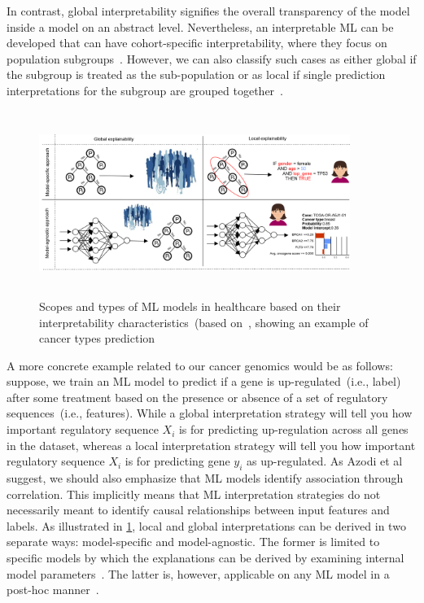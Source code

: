 \hspace*{3.5mm} In contrast, global interpretability signifies the overall transparency of the model inside a model on an abstract level. Nevertheless, an interpretable ML can be developed that can have cohort-specific interpretability, where they focus on population subgroups~\cite{stiglic2020interpretability}. However, we can also classify such cases as either global if the subgroup is treated as the sub-population or as local if single prediction interpretations for the subgroup are grouped together~\cite{molnar2019interpretable}. 

\begin{figure}[h]
	\centering
	\includegraphics[width=0.9\textwidth,height=60mm]{images/lvg_cancer.png}	
    \caption{Scopes and types of ML models in healthcare based on their interpretability characteristics~(based on~\cite{stiglic2020interpretability}, showing an example of cancer types prediction}	
	\label{fig:local_vs_global_ex}
\end{figure}

\hspace*{3.5mm} A more concrete example related to our cancer genomics would be as follows: suppose, we train an ML model to predict if a gene is up-regulated~(i.e., label) after some treatment based on the presence or absence of a set of regulatory sequences~(i.e., features). While a global interpretation strategy will tell you how important regulatory sequence $X_i$ is for predicting up-regulation across all genes in the dataset, whereas a local interpretation strategy will tell you how important regulatory sequence $X_i$ is for predicting gene $y_i$ as up-regulated. As Azodi et al~\cite{azodi2020opening} suggest, we should also emphasize that ML models identify association through correlation. This implicitly means that ML interpretation strategies do not necessarily meant to identify causal relationships between input features and labels. %
As illustrated in \cref{fig:local_vs_global_ex}, local and global interpretations can be derived in two separate ways: model-specific and model-agnostic. The former is limited to specific models by which the explanations can be derived by examining internal model parameters~\cite{stiglic2020interpretability}. The latter is, however, applicable on any ML model in a post-hoc manner~\cite{molnar2019interpretable}. 

